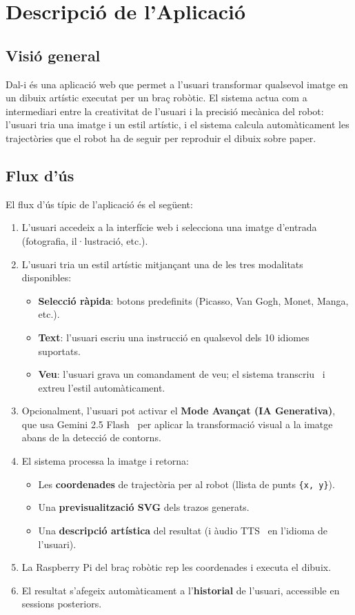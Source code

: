 \section{Descripció de l'Aplicació}
\label{sec:descripcio}

\subsection{Visió general}

Dal-i és una aplicació web que permet a l'usuari transformar qualsevol imatge en un dibuix artístic executat per un braç robòtic. El sistema actua com a intermediari entre la creativitat de l'usuari i la precisió mecànica del robot: l'usuari tria una imatge i un estil artístic, i el sistema calcula automàticament les trajectòries que el robot ha de seguir per reproduir el dibuix sobre paper.

\subsection{Flux d'ús}

El flux d'ús típic de l'aplicació és el següent:

\begin{enumerate}
  \item L'usuari accedeix a la interfície web i selecciona una imatge d'entrada (fotografia, il·lustració, etc.).
  \item L'usuari tria un estil artístic mitjançant una de les tres modalitats disponibles:
    \begin{itemize}
      \item \textbf{Selecció ràpida}: botons predefinits (Picasso, Van Gogh, Monet, Manga, etc.).
      \item \textbf{Text}: l'usuari escriu una instrucció en qualsevol dels 10 idiomes suportats.
      \item \textbf{Veu}: l'usuari grava un comandament de veu; el sistema transcriu~\cite{stt} i extreu l'estil automàticament.
    \end{itemize}
  \item Opcionalment, l'usuari pot activar el \textbf{Mode Avançat (IA Generativa)}, que usa Gemini 2.5 Flash~\cite{vertexai} per aplicar la transformació visual a la imatge abans de la detecció de contorns.
  \item El sistema processa la imatge i retorna:
    \begin{itemize}
      \item Les \textbf{coordenades} de trajectòria per al robot (llista de punts \texttt{\{x, y\}}).
      \item Una \textbf{previsualització SVG} dels trazos generats.
      \item Una \textbf{descripció artística} del resultat (i àudio TTS~\cite{tts} en l'idioma de l'usuari).
    \end{itemize}
  \item La Raspberry Pi del braç robòtic rep les coordenades i executa el dibuix.
  \item El resultat s'afegeix automàticament a l'\textbf{historial} de l'usuari, accessible en sessions posteriors.
\end{enumerate}

